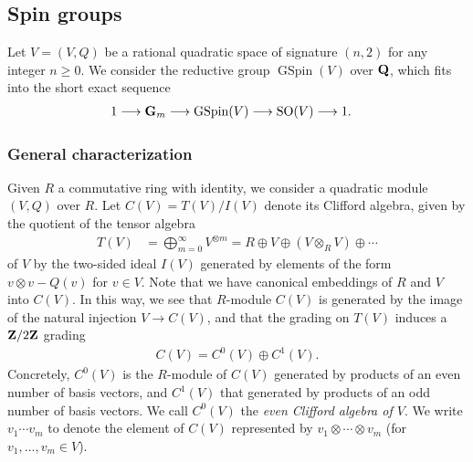 \documentclass{amsart}
\theoremstyle{definition}
\theoremstyle{definition}
\theoremstyle{definition}
\begin{document}
\subsection{Spin groups}

Let $V = (V,Q)$ be a rational quadratic space of signature $(n, 2)$ for any integer $n \geq 0$. 
We consider the reductive group $\operatorname{GSpin}(V)$ over ${\bf{Q}}$, which fits into the short exact sequence 
\begin{align}\label{spinSES} 1 &\longrightarrow {\bf{G}}_m \longrightarrow \operatorname{GSpin}(V) \longrightarrow \operatorname{SO}(V) \longrightarrow 1. \end{align}

\subsubsection{General characterization}

Given $R$ a commutative ring with identity, we consider a quadratic module $(V, Q)$ over $R$. 
Let $C(V) = T(V) / I(V)$ denote its Clifford algebra, given by the quotient of the tensor algebra 
\begin{align*} T(V) &= \bigoplus_{m =0}^{\infty} V^{\otimes m} = R \oplus V \oplus (V \otimes_R V) \oplus \cdots \end{align*}
of $V$ by the two-sided ideal $I(V)$ generated by elements of the form $v \otimes v - Q(v)$ for $v \in V$. 
Note that we have canonical embeddings of $R$ and $V$ into $C(V)$. 
In this way, we see that $R$-module $C(V)$ is generated by the image of the natural injection $V \rightarrow C(V)$, 
and that the grading on $T(V)$ induces a ${\bf{Z}}/ 2{\bf{Z}}$ grading \begin{align*} C(V) = C^0(V) \oplus C^1(V). \end{align*} 
Concretely, $C^0(V)$ is the $R$-module of $C(V)$ generated by products of an even number of basis vectors, and $C^1(V)$ that generated by products of an odd number of basis vectors. 
We call $C^0(V)$ the {\it{even Clifford algebra of $V$}}. We write $v_1 \cdots v_m$ to denote the element of $C(V)$ represented by $v_1 \otimes \cdots \otimes v_m$ (for $v_1, \ldots, v_m \in V$).
\end{document}
